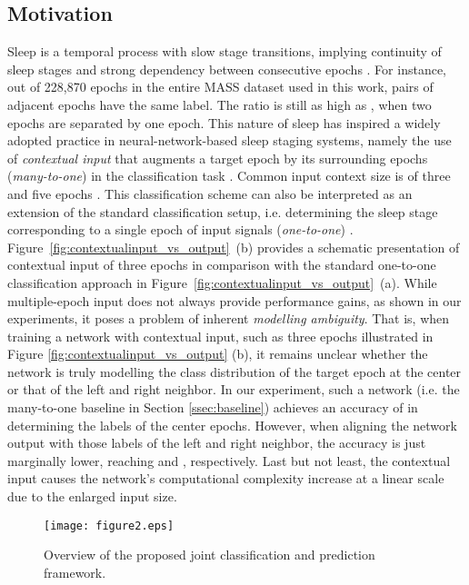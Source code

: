 \documentclass[10pt,twocolumn,twoside]{IEEEtran}
\begin{document}
\subsection{Motivation}
Sleep is a temporal process with slow stage transitions, implying continuity of sleep stages and strong dependency between consecutive epochs \cite{Iber2007, Liang2011,Sousa2015}. For instance, out of 228,870 epochs in the entire MASS dataset \cite{Oreilly2014} used in this work,   pairs of adjacent epochs have the same label. The ratio is still as high as , when two epochs are separated by one epoch. This nature of sleep has inspired a widely adopted practice in neural-network-based sleep staging systems, namely the use of \emph{contextual input} that augments a target epoch by its surrounding epochs (\emph{many-to-one}) in the classification task \cite{Stephansen2017, Mikkelsen2018, Tsinalis2016, Supratak2017}. Common input context size is of three and five epochs \cite{Chambon2018,Mikkelsen2018,Tsinalis2016, Tsinalis2016b}. This classification scheme can also be interpreted as an extension of the standard classification setup,  i.e. determining the sleep stage corresponding to a single epoch of input signals (\emph{one-to-one}) \cite{Phan2018c, Phan2018d, Andreotti2018}. Figure~\ref{fig:contextualinput_vs_output}~(b) provides a schematic presentation of contextual input of three epochs in comparison with the standard one-to-one classification approach in Figure~\ref{fig:contextualinput_vs_output}~(a). While multiple-epoch input  does not always provide performance gains, as shown in our experiments, it poses a problem of inherent \emph{modelling ambiguity}. That is, when training a network with contextual input, such as three epochs illustrated in Figure \ref{fig:contextualinput_vs_output} (b), it remains unclear whether the network is truly modelling the class distribution of the target epoch at the center or that of the left and right neighbor. In our experiment, such a network (i.e. the many-to-one baseline in Section \ref{ssec:baseline}) achieves an accuracy of  in determining the labels of the center epochs. However, when aligning the network output with those labels of the left and right neighbor, the accuracy is just marginally lower, reaching  and , respectively. Last but not least, the contextual input causes the network's computational complexity increase at a linear scale due to the enlarged input size.

\begin{figure*} [!t]
	\centering
	\texttt{[image: figure2.eps]}
	\vspace{-0.1cm}
	\caption{Overview of the proposed joint classification and prediction framework.}
	\label{fig:overview}
	\vspace{-0.2cm}
\end{figure*}
\end{document}
